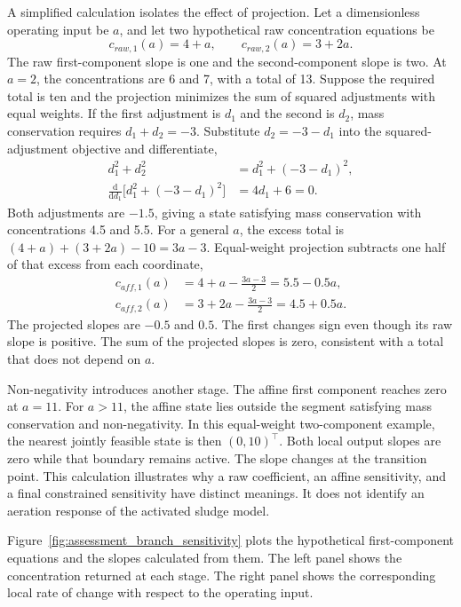 A simplified calculation isolates the effect of projection. Let a dimensionless operating input be $a$, and let two hypothetical raw concentration equations be
\[
c_{raw,1}(a)=4+a,\qquad c_{raw,2}(a)=3+2a.
\]
The raw first-component slope is one and the second-component slope is two. At $a=2$, the concentrations are 6 and 7, with a total of 13. Suppose the required total is ten and the projection minimizes the sum of squared adjustments with equal weights. If the first adjustment is $d_1$ and the second is $d_2$, mass conservation requires $d_1+d_2=-3$. Substitute $d_2=-3-d_1$ into the squared-adjustment objective and differentiate,
\[
\begin{aligned}
d_1^2+d_2^2&=d_1^2+(-3-d_1)^2,\\
\frac{\mathrm d}{\mathrm d d_1}\bigl[d_1^2+(-3-d_1)^2\bigr]
&=4d_1+6=0.
\end{aligned}
\]
Both adjustments are $-1.5$, giving a state satisfying mass conservation with concentrations 4.5 and 5.5. For a general $a$, the excess total is $(4+a)+(3+2a)-10=3a-3$. Equal-weight projection subtracts one half of that excess from each coordinate,
\[
\begin{aligned}
c_{aff,1}(a)&=4+a-\frac{3a-3}{2}=5.5-0.5a,\\
c_{aff,2}(a)&=3+2a-\frac{3a-3}{2}=4.5+0.5a.
\end{aligned}
\]
The projected slopes are $-0.5$ and $0.5$. The first changes sign even though its raw slope is positive. The sum of the projected slopes is zero, consistent with a total that does not depend on $a$.

Non-negativity introduces another stage. The affine first component reaches zero at $a=11$. For $a>11$, the affine state lies outside the segment satisfying mass conservation and non-negativity. In this equal-weight two-component example, the nearest jointly feasible state is then $(0,10)^\top$. Both local output slopes are zero while that boundary remains active. The slope changes at the transition point. This calculation illustrates why a raw coefficient, an affine sensitivity, and a final constrained sensitivity have distinct meanings. It does not identify an aeration response of the activated sludge model.

Figure~\ref{fig:assessment_branch_sensitivity} plots the hypothetical first-component equations and the slopes calculated from them. The left panel shows the concentration returned at each stage. The right panel shows the corresponding local rate of change with respect to the operating input.


